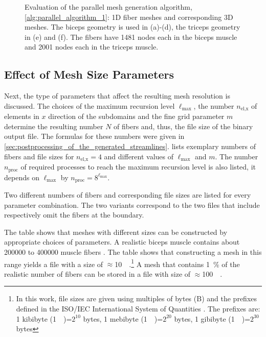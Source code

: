 \begin{figure}
  \caption{Evaluation of the parallel mesh generation algorithm, \cref{alg:parallel_algorithm_1}: 1D fiber meshes and corresponding 3D meshes. The biceps geometry is used in (a)-(d), the triceps geometry in (e) and (f). The fibers have 1481 nodes each in the biceps muscle and 2001 nodes each in the triceps muscle.}%
  \label{fig:muscle_meshes}%
\end{figure}%

\subsection{Effect of Mesh Size Parameters}\label{sec:mesh_generation_mesh_size_parameters}

Next, the type of parameters that affect the resulting mesh resolution is discussed.
The choices of the maximum recursion level $\ell_\text{max}$, the number $n_\text{el,x}$ of elements in $x$ direction of the subdomains and the fine grid parameter $m$ determine the resulting number $N$ of fibers and, thus, the file size of the binary output file. The formulas for these numbers were given in \cref{sec:postprocessing_of_the_generated_streamlines}.  lists exemplary numbers of fibers and file sizes for $n_\text{el,x}=4$ and different values of $\ell_\text{max}$ and $m$. The number $n_\text{proc}$ of required processes to reach the maximum recursion level is also listed, it depends on $\ell_\text{max}$ by $n_\text{proc}=8^{\ell_\text{max}}$.

Two different numbers of fibers and corresponding file sizes are listed for every parameter combination. The two variants correspond to the two files that include respectively omit the fibers at the boundary.

The table shows that meshes with different sizes can be constructed by appropriate choices of parameters. A realistic biceps muscle contains about \num{200000} to \num{400000} muscle fibers \cite{MacDougall1984}. The table shows that constructing a mesh in this range yields a file with a size of $\approx$\SI{10}{\gibi\byte}.\footnote{
In this work, file sizes are given using multiples of bytes (B) and the prefixes defined in the ISO/IEC International System of Quantities \cite{ISOmebi}. The prefixes are: 1 kibibyte (\SI{1}{\kibi\byte})=$2^{10}$ bytes, 1 mebibyte (\SI{1}{\mebi\byte})=$2^{20}$ bytes, 1 gibibyte (\SI{1}{\gibi\byte})=$2^{30}$ bytes}
A mesh that contains \SI{1}{\percent} of the realistic number of fibers can be stored in a file with size of $\approx$\SI{100}{\mebi\byte}.

